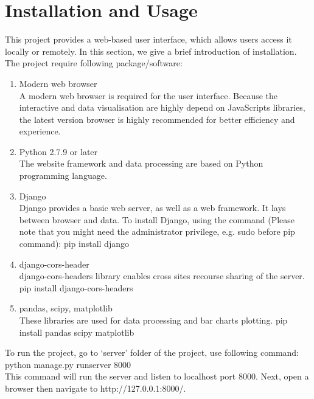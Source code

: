 \documentclass[11pt,letter]{article}
\begin{document}
\section {Installation and Usage}

This project provides a web-based user interface, which allows users access it locally or remotely. In this section, we give a brief introduction of installation. \\
The project require following package/software: \\
\begin{enumerate}
\item Modern web browser\\
A modern web browser is required for the user interface. Because the interactive and data visualisation are highly depend on JavaScripts libraries, the latest version browser is highly recommended for better efficiency and experience.\\
\item Python 2.7.9 or later\\
The website framework and data processing are based on Python programming language.\\
\item Django\\
Django provides a basic web server, as well as a web framework. It lays between browser and data. To install Django, using the command (Please note that you might need the administrator privilege, e.g. sudo before pip command):
pip install django\\
\item django-cors-header\\
django-cors-headers library enables cross sites recourse sharing of the server.
pip install django-cors-headers\\
\item pandas, scipy, matplotlib\\
These libraries are used for data processing and bar charts plotting.
pip install pandas scipy matplotlib\\

\end{enumerate}
To run the project, go to ‘server’ folder of the project, use following command: \\
python manage.py runserver 8000 \\
This command will run the server and listen to localhost port 8000. Next, open a browser then navigate to http://127.0.0.1:8000/. \\
\end{document}

